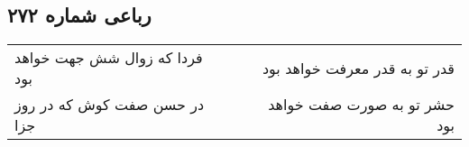 \begin{center}
\section*{رباعی شماره ۲۷۲}
\label{sec:sh272}
\begin{longtable}{l p{0.5cm} r}
فردا که زوال شش جهت خواهد بود
&&
قدر تو به قدر معرفت خواهد بود
\\
در حسن صفت کوش که در روز جزا
&&
حشر تو به صورت صفت خواهد بود
\\
\end{longtable}
\end{center}
